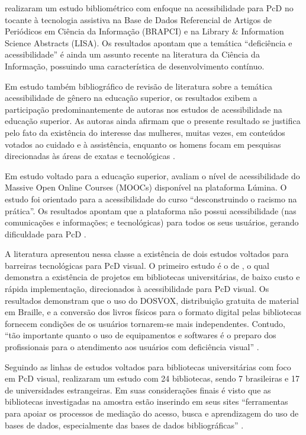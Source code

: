 \documentclass{textolivre}
\begin{document}
\textcite{vianna2017} realizaram um estudo bibliométrico com enfoque na acessibilidade para PcD no tocante à tecnologia assistiva na Base de Dados Referencial de Artigos de Periódicos em Ciência da Informação (BRAPCI) e na Library \& Information Science Abstracts (LISA). Os resultados apontam que a temática “deficiência e acessibilidade” é ainda um assunto recente na literatura da Ciência da Informação, possuindo uma característica de desenvolvimento contínuo.

Em estudo também bibliográfico de revisão de literatura sobre a temática acessibilidade de gênero na educação superior, os resultados exibem a participação predominantemente de autoras nos estudos de acessibilidade na educação superior. As autoras ainda afirmam que o presente resultado se justifica pelo fato da existência do interesse das mulheres, muitas vezes, em conteúdos votados ao cuidado e à assistência, enquanto os homens focam em pesquisas direcionadas às áreas de exatas e tecnológicas \cite{silva+gonzalezgil2017}.

Em estudo voltado para a educação superior, \textcite{souza2019} avaliam o nível de acessibilidade do Massive Open Online Courses (MOOCs) disponível na plataforma Lúmina. O estudo foi orientado para a acessibilidade do curso “desconstruindo o racismo na prática”. Os resultados apontam que a plataforma não possui acessibilidade (nas comunicações e informações; e tecnológicas) para todos os seus usuários, gerando dificuldade para PcD \cite{souza2019}.

A literatura apresentou nessa classe a existência de dois estudos voltados para barreiras tecnológicas para PcD visual. O primeiro estudo é o de \textcite{fialho2012}, o qual demonstra a existência de projetos em bibliotecas universitárias, de baixo custo e rápida implementação, direcionados à acessibilidade para PcD visual. Os resultados demonstram que o uso do DOSVOX, distribuição gratuita de material em Braille, e a conversão dos livros físicos para o formato digital pelas bibliotecas fornecem condições de os usuários tornarem-se mais independentes. Contudo, “tão importante quanto o uso de equipamentos e softwares é o preparo dos profissionais para o atendimento aos usuários com deficiência visual” \cite[p. 165]{fialho2012}.

Seguindo as linhas de estudos voltados para bibliotecas universitárias com foco em PcD visual, \textcite{novelli2014} realizaram um estudo com 24 bibliotecas, sendo 7 brasileiras e 17 de universidades estrangeiras. Em suas considerações finais é visto que as bibliotecas investigadas na amostra estão inserindo em seus sites “ferramentas para apoiar os processos de mediação do acesso, busca e aprendizagem do uso de bases de dados, especialmente das bases de dados bibliográficas” \cite[p. 47]{novelli2014}.
\end{document}
